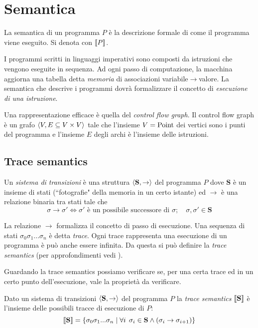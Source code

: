 \section{Semantica}

\begin{definition}[Semantica]
La semantica di un programma $P$ è la descrizione formale di come il programma viene eseguito. Si denota con $\llbracket P \rrbracket$. 
\end{definition}

I programmi scritti in linguaggi imperativi sono composti da istruzioni che vengono eseguite in sequenza. Ad ogni passo di computazione, la macchina aggiorna una tabella detta \emph{memoria} di associazioni variabile$\rightarrow$valore. La semantica che descrive i programmi dovrà formalizzare il concetto di \emph{esecuzione di una istruzione}. 

Una rappresentazione efficace è quella del \emph{control flow graph}. Il control flow graph è un grafo $\langle V, E \subseteq V \times V \rangle$ tale che l'insieme $V = \mathrm{Point}$ dei vertici sono i punti del programma e l'insieme $E$ degli archi è l'insieme delle istruzioni. 

\subsection{Trace semantics}

\begin{definition}
Un \emph{sistema di transizioni} è una struttura $\langle \mathbf{S}, \to \rangle$ del programma $P$ dove $\mathbf{S}$ è un insieme di stati (``fotografie" della memoria in un certo istante) ed $\to$ è una relazione binaria tra stati tale che
\[ \sigma \to \sigma' \iff \sigma' \text{ è un possibile successore di } \sigma; \quad \sigma, \sigma' \in \mathbf{S} \]
\end{definition}

La relazione $\to$ formalizza il concetto di passo di esecuzione. Una sequenza di stati $\sigma_0 \sigma_1 ... \sigma_n$ è detta \emph{trace}. Ogni trace rappresenta una esecuzione di un programma è può anche essere infinita. Da questa si può definire la \emph{trace semantics} (per approfondimenti vedi \cite{xavier}).

Guardando la trace semantics possiamo verificare se, per una certa trace ed in un certo punto dell'esecuzione, vale la proprietà da verificare.

Dato un sistema di transizioni $\langle \mathbf{S}, \to \rangle$ del programma $P$ la \emph{trace semantics} $\llbracket \mathbf{S} \rrbracket$ è l'insieme delle possibili tracce di esecuzione di $P$:
\[ \llbracket \mathbf{S} \rrbracket = \{ \sigma_0 \sigma_1 ... \sigma_n \mid \forall i \;\, \sigma_i \in \mathbf{S} \land (\sigma_i \to \sigma_{i+1}) \} \]

